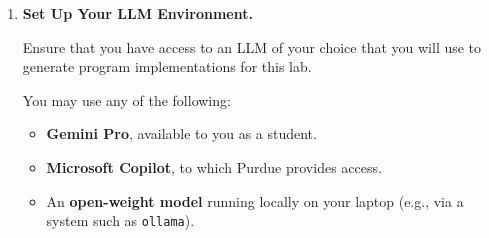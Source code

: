 \begin{enumerate}
  \begin{tcolorbox}[colback=yellow!10,colframe=black,boxrule=0.5pt]
  \textbf{Deliverable:} Give your derivation of the 2oo3 system failure probability.
  Your answer must:
  \begin{itemize}
      \item Clearly enumerate the failure cases,
      \item Use the independence assumption explicitly,
      \item Present the final expression as a simplified closed-form formula.
  \end{itemize}

  \medskip
  \textbf{Solution.}
  \begin{itemize}
      \item \textbf{Failure cases:} The 2oo3 system fails when fewer than two versions are correct, \ie when exactly 0 or exactly 1 version is correct.
      \item \textbf{Under independence:} Let $p$ be the probability a version fails and $q = 1 - p$ the probability it is correct. By independence:
      \begin{itemize}
          \item $P(0 \text{ correct}) = P(\text{all three fail}) = p \cdot p \cdot p = p^3$.
          \item $P(1 \text{ correct}) = 3 p^2 q$ (only V1 correct, or only V2, or only V3; each has probability $p^2 q$).
      \end{itemize}
      \item \textbf{Closed form:}
      \[
      P(\text{system failure}) = p^3 + 3p^2 q = p^2(p + 3q) = p^2(3 - 2p).
      \]
  \end{itemize}
  \end{tcolorbox} 
  
  \item \textbf{Set Up Your LLM Environment.}

  Ensure that you have access to an LLM of your choice that you will use to generate program implementations for this lab.

  You may use any of the following:

  \begin{itemize}
    \item \textbf{Gemini Pro}, available to you as a student.
    \item \textbf{Microsoft Copilot}, to which Purdue provides access.
    \item An \textbf{open-weight model} running locally on your laptop (e.g., via a system such as \texttt{ollama}).
  \end{itemize}


\end{enumerate}

